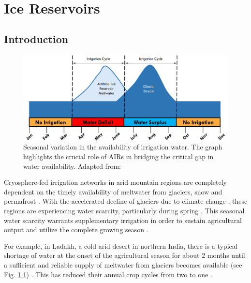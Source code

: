 \chapter{Ice Reservoirs}

\section{Introduction}

\begin{figure}[t]
\centering
\includegraphics[width=12cm]{figs/irrigation_cycles.png}

\caption{Seasonal variation in the availability of irrigation water. The graph highlights the crucial role of
AIRs in bridging the critical gap in water availability. Adapted from: \cite{nusserLocalKnowledgeGlobal2016}}

\label{fig:irrigation_cycles}
\end{figure}

Cryosphere-fed irrigation networks in arid mountain regions are completely dependent on the timely availability
of meltwater from glaciers, snow and permafrost \citep{immerzeelImportanceVulnerabilityWorld2020,
farhanHydrologicalRegimesConjunction2015, tveitenGlacierGrowingLocal2007}. With the accelerated decline of
glaciers due to climate change \citep{nusserLocalKnowledgeGlobal2016}, these regions are experiencing water
scarcity, particularly during spring \citep{norphelSnowWaterHarvesting2015,
mukhopadhyayReevaluationSnowmeltGlacial2015} . This seasonal water scarcity warrants supplementary irrigation in
order to sustain agricultural output and utilize the complete growing season
\citep{nusserLocalKnowledgeGlobal2016, vincentEnergyClimateChange2009}.

For example, in Ladakh, a cold arid desert in northern India, there is a typical shortage of water at the onset
of the agricultural season for about 2 months until a sufficient and reliable supply of meltwater from glaciers
becomes available (see Fig. \ref{fig:irrigation_cycles}) \citep{norphelSnowWaterHarvesting2015,
nusserLocalKnowledgeGlobal2016, vincentEnergyClimateChange2009}. This has reduced their annual crop cycles from
two to one \citep{nusserSociohydrologyArtificialGlaciers2019}.

